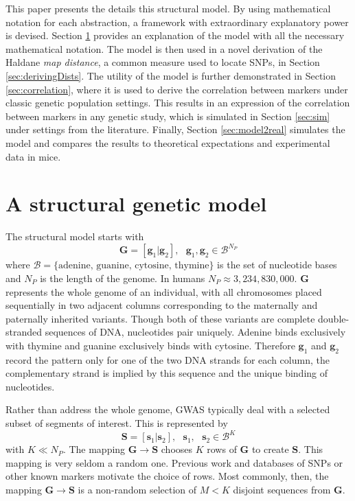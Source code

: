 \documentclass[sts]{imsart}
\newcommand{\ve}[1]{\mathbf{#1}}           %
\newcommand{\m}[1]{\mathbf{#1}}               %
\begin{document}
This paper presents the details this structural model. By using mathematical notation for each abstraction, a framework with extraordinary explanatory power is devised. Section \ref{sec:theModel} provides an explanation of the model with all the necessary mathematical notation. The model is then used in a novel derivation of the Haldane \emph{map distance}, a common measure used to locate SNPs, in Section \ref{sec:derivingDists}. The utility of the model is further demonstrated in Section \ref{sec:correlation}, where it is used to derive the correlation between markers under classic genetic population settings. This results in an expression of the correlation between markers in any genetic study, which is simulated in Section \ref{sec:sim} under settings from the literature. Finally, Section \ref{sec:model2real} simulates the model and compares the results to theoretical expectations and experimental data in mice.

\section{A structural genetic model} \label{sec:theModel}

The structural model starts with
$$\m{G} = [\ve{g}_1| \ve{g}_2], \text{ } \ve{g}_1, \ve{g}_2 \in \mathcal{B}^{N_P}$$
where $\mathcal{B} = \{\text{adenine, guanine, cytosine, thymine}\}$ is the set of nucleotide bases and $N_P$ is the length of the genome. In humans $N_P \approx 3,234,830,000$. $\m{G}$ represents the whole genome of an individual, with all chromosomes placed sequentially in two adjacent columns corresponding to the maternally and paternally inherited variants. Though both of these variants are complete double-stranded sequences of DNA, nucleotides pair uniquely. Adenine binds exclusively with thymine and guanine exclusively binds with cytosine. Therefore $\ve{g}_1$ and $\ve{g}_2$ record the pattern only for one of the two DNA strands for each column, the complementary strand is implied by this sequence and the unique binding of nucleotides.

Rather than address the whole genome, GWAS typically deal with a selected subset of segments of interest. This is represented by
$$\m{S} = [\ve{s}_1 | \ve{s}_2], \text{ } \ve{s}_1, \text{ } \ve{s}_2 \in \mathcal{B}^K$$
with $K \ll N_P$. The mapping $\m{G} \rightarrow \m{S}$ chooses $K$ rows of $\m{G}$ to create $\m{S}$. This mapping is very seldom a random one. Previous work and databases of SNPs or other known markers motivate the choice of rows. Most commonly, then, the mapping $\m{G} \rightarrow \m{S}$ is a non-random selection of $M < K$ disjoint sequences from $\m{G}$.
\end{document}
